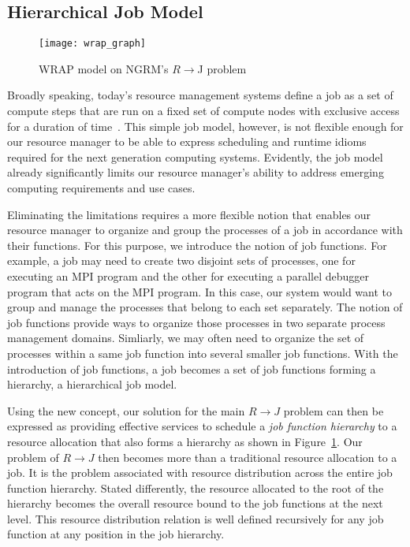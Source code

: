 \subsection{Hierarchical Job Model}

\begin{figure}
  \centering
    \texttt{[image: wrap\_graph]}
  \caption{WRAP model on NGRM's $R \rightarrow $J problem}
  \label{fig:jobrm}
\end{figure}

Broadly speaking, today's resource management systems define a job as a set
of compute steps that are run on a fixed set of compute nodes with exclusive access for
a duration of time~\cite{Jette02slurm}.
This simple job model, however, is not flexible enough for our resource manager to
be able to express scheduling and runtime idioms required for the next generation computing systems.
Evidently, the job model already significantly limits
our resource manager's ability to address emerging
computing requirements and use cases.

Eliminating the limitations requires a more flexible notion that enables
our resource manager to organize and group the processes of a job
in accordance with their functions. For this purpose,
we introduce the notion of job functions. For example,
a job may need to create two disjoint sets of processes,
one for executing an MPI program and
the other for executing a parallel debugger program
that acts on the MPI program.
In this case, our system would want to group and manage the processes
that belong to each set separately. The notion of job functions
provide ways to organize those processes in two separate process management
domains. Simliarly, we may often need to organize
the set of processes within a same job function
into several smaller job functions. With the introduction of job functions,
a job becomes a set of job functions forming a hierarchy,
a hierarchical job model.

Using the new concept, our solution for the main
$R \rightarrow J$ problem can then be expressed as
providing effective services to schedule
a {\em job function hierarchy} to a resource allocation
that also forms a hierarchy as shown in
Figure~\ref{fig:jobrm}.
Our problem of $R \rightarrow J$ then becomes more than a traditional
resource allocation to a job. It is the problem associated with
resource distribution across the entire job function hierarchy.
Stated differently, the resource allocated to the root of the hierarchy
becomes the overall resource bound to the job functions at
the next level. This resource distribution relation is well defined
recursively for any job function at any position in the job hierarchy.


